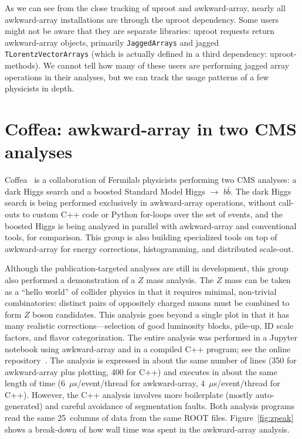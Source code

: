 \documentclass[a4paper]{jpconf}
\begin{document}
As we can see from the close tracking of uproot and awkward-array, nearly all awkward-array installations are through the uproot dependency. Some users might not be aware that they are separate libraries: uproot requests return awkward-array objects, primarily {\tt JaggedArrays} and jagged {\tt TLorentzVectorArrays} (which is actually defined in a third dependency: uproot-methods). We cannot tell how many of these users are performing jagged array operations in their analyses, but we can track the usage patterns of a few physicists in depth.

\section{Coffea: awkward-array in two CMS analyses}

Coffea~\cite{coffea} is a collaboration of Fermilab physicists performing two CMS analyses: a dark Higgs search and a boosted Standard Model Higgs $\to$ $b\bar{b}$. The dark Higgs search is being performed exclusively in awkward-array operations, without call-outs to custom C++ code or Python for-loops over the set of events, and the boosted Higgs is being analyzed in parallel with awkward-array and conventional tools, for comparison. This group is also building specialized tools on top of awkward-array for energy corrections, histogramming, and distributed scale-out.

Although the publication-targeted analyses are still in development, this group also performed a demonstration of a $Z$ mass analysis. The $Z$ mass can be taken as a ``hello world'' of collider physics in that it requires minimal, non-trivial combinatorics: distinct pairs of oppositely charged muons must be combined to form $Z$ boson candidates. This analysis goes beyond a single plot in that it has many realistic corrections---selection of good luminosity blocks, pile-up, ID scale factors, and flavor categorization. The entire analysis was performed in a Jupyter notebook using awkward-array and in a compiled C++ program; see the online repository~\cite{zpeak}. The analysis is expressed in about the same number of lines (350 for awkward-array plus plotting, 400 for C++) and executes in about the same length of time (6~$\mu$s/event/thread for awkward-array, 4~$\mu$s/event/thread for C++). However, the C++ analysis involves more boilerplate (mostly auto-generated) and careful avoidance of segmentation faults. Both analysis programs read the same 25~columns of data from the same ROOT files. Figure~\ref{fig:zpeak} shows a break-down of how wall time was spent in the awkward-array analysis.
\end{document}

